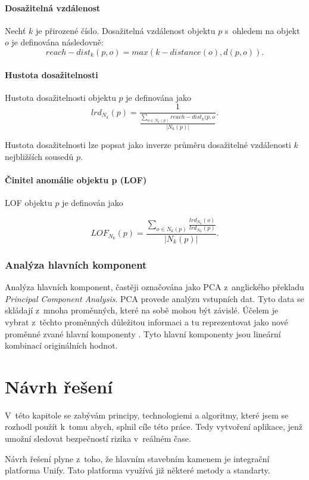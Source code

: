 \documentclass[thesis=M,czech]{FITthesis}[2012/10/20]
\begin{document}
			\subsubsection{Dosažitelná vzdálenost}
				Nechť $k$ je přirozené číslo. Dosažitelná vzdálenost objektu $p$ s~ohledem na objekt $o$ je definována následovně: 
				$$ reach-dist_k(p, o) = max (k-distance(o), d(p, o)).$$
				
			\subsubsection{Hustota dosažitelnosti}
				Hustota dosažitelnosti objektu $p$ je definována jako
				$$ lrd_{N_k}(p) = \frac{1}{ \frac{\sum_{o \in N_k(p)} reach-dist_k(p,o}{|N_k(p)|}}.$$
				
				Hustota dosažitelnosti lze popsat jako inverze průměru dosažitelné vzdálenosti $k$ nejbližších sousedů $p$.
				
			\subsubsection{Činitel anomálie objektu p (LOF)}
				LOF objektu $p$ je definován jako 
				
				$$LOF_{N_k}(p) = \frac{\sum_{o \in N_k(p)} \frac{lrd_{N_k}(o)}{lrd_{N_k}(p)}}{|N_k(p)|}.$$		
		
		\subsection{Analýza hlavních komponent}
		\label{sec:pca}
		Analýza hlavních komponent, častěji označována jako PCA z~anglického překladu \textit{Principal Component Analysis}. PCA provede analýzu vstupních dat. Tyto data se skládají z~mnoha proměnných, které na sobě mohou být závislé. Účelem je vybrat z~těchto proměnných důležitou informaci a tu reprezentovat jako nové proměnné zvané hlavní komponenty \cite{PCA_book}. Tyto hlavní komponenty jsou lineární kombinací originálních hodnot.
		
	

\chapter{Návrh řešení}
	V~této kapitole se zabývám principy, technologiemi a algoritmy, které jsem se rozhodl použít k~tomu abych, splnil cíle této práce. Tedy vytvoření aplikace, jenž umožní sledovat bezpečností rizika v~reálném čase.
	
	Návrh řešení plyne z~toho, že hlavním stavebním kamenem je integrační platforma Unify. Tato platforma využívá již některé metody a standarty. 
	
\end{document}
